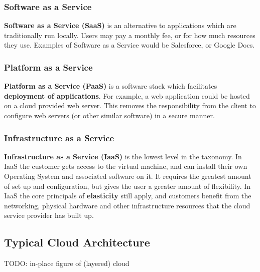 \documentclass{article}
\begin{document}
\subsubsection{Software as a Service}

\textbf{Software as a Service (SaaS)} is an alternative to applications which are traditionally run locally. Users may pay a monthly fee, or for how much resources they use. Examples of Software as a Service would be Salesforce, or Google Docs.

\subsubsection{Platform as a Service}

\textbf{Platform as a Service (PaaS)} is a software stack which facilitates \textbf{deployment of applications}. For example, a web application could be hosted on a cloud provided web server. This removes the responsibility from the client to configure web servers (or other similar software) in a secure manner.

\subsubsection{Infrastructure as a Service}

\textbf{Infrastructure as a Service (IaaS)} is the lowest level in the taxonomy. In IaaS the customer gets access to the virtual machine, and can install their own Operating System and associated software on it. It requires the greatest amount of set up and configuration, but gives the user a greater amount of flexibility. In IaaS the core principals of \textbf{elasticity} still apply, and customers benefit from the networking, physical hardware and other infrastructure resources that the cloud service provider has built up. 

\subsection{Typical Cloud Architecture}

TODO: in-place figure of (layered) cloud
\end{document}

